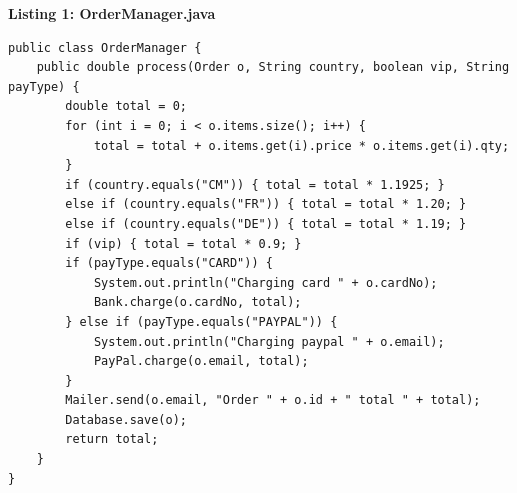 \documentclass[border=10pt]{standalone}
\begin{document}
\pagecolor{paper}\begin{minipage}{17.5cm}\vspace{4pt}
\textbf{\small\color{gray}Listing 1: OrderManager.java}\par\vspace{2pt}
\lstset{style=sv}
\begin{lstlisting}
public class OrderManager {
    public double process(Order o, String country, boolean vip, String payType) {
        double total = 0;
        for (int i = 0; i < o.items.size(); i++) {
            total = total + o.items.get(i).price * o.items.get(i).qty;
        }
        if (country.equals("CM")) { total = total * 1.1925; }
        else if (country.equals("FR")) { total = total * 1.20; }
        else if (country.equals("DE")) { total = total * 1.19; }
        if (vip) { total = total * 0.9; }
        if (payType.equals("CARD")) {
            System.out.println("Charging card " + o.cardNo);
            Bank.charge(o.cardNo, total);
        } else if (payType.equals("PAYPAL")) {
            System.out.println("Charging paypal " + o.email);
            PayPal.charge(o.email, total);
        }
        Mailer.send(o.email, "Order " + o.id + " total " + total);
        Database.save(o);
        return total;
    }
}
\end{lstlisting}
\vspace{2pt}\end{minipage}
\end{document}
